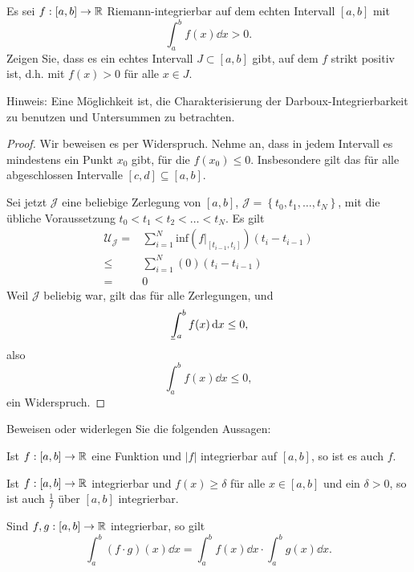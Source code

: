 \begin{Problem}
	Es sei $f:[a,b]\to \mathbb{R}$ Riemann-integrierbar auf dem echten Intervall $[a,b]$ mit
	\[
		\int_a^b f(x)\dd{x}>0
	.\] 
	Zeigen Sie, dass es ein echtes Intervall $J\subset [a,b]$ gibt, auf dem $f$ strikt positiv ist, d.h. mit $f(x)>0$ f\"{u}r alle $x\in J$.

	{\footnotesize Hinweis: Eine Möglichkeit ist, die Charakterisierung der Darboux-Integrierbarkeit zu benutzen und Untersummen zu betrachten.}
\end{Problem}
\begin{proof}
	Wir beweisen es per Widerspruch. Nehme an, dass in jedem Intervall es mindestens ein Punkt $x_0$ gibt, f\"{u}r die $f(x_0)\le 0$. Insbesondere gilt das f\"{u}r alle abgeschlossen Intervalle $[c,d]\subseteq [a,b]$.

	Sei jetzt $\mathcal{J}$ eine beliebige Zerlegung von $[a,b]$, $\mathcal{J}=\left\{ t_0,t_1,\dots,t_N \right\} $, mit die übliche Voraussetzung $t_0< t_1 < t_2<\dots< t_N$. Es gilt
	\begin{align*}
		\mathcal{U}_{\mathcal{J}}=&\sum_{i=1}^{N} \text{inf}\left( f|_{[t_{i-1},t_i]} \right) (t_i-t_{i-1})\\
		\le& \sum_{i=1}^{N} (0)(t_i-t_{i-1})\\
		=& 0
	\end{align*}
	Weil $\mathcal{J}$ beliebig war, gilt das f\"{u}r alle Zerlegungen, und
	\[
		\mkern3mu\underline{\vphantom{\intop}\mkern7mu}\mkern-10mu\int_a^b f(x)\dd{x}\le 0
	,\]
	also
	\[
		\int_a^b f(x)\dd{x}\le 0
	,\] 
	ein Widerspruch.
\end{proof}
\begin{Problem}
	Beweisen oder widerlegen Sie die folgenden Aussagen:
	\begin{parts}
	\item Ist $f:[a,b]\to \mathbb{R}$ eine Funktion und $|f|$ integrierbar auf $[a,b]$, so ist es auch $f$.
	\item Ist $f:[a,b]\to \mathbb{R}$ integrierbar und $f(x)\ge \delta$ f\"{u}r alle $x\in [a,b]$ und ein $\delta>0$, so ist auch $\frac{1}{f}$ \"{u}ber $[a,b]$ integrierbar.
	\item Sind $f,g:[a,b]\to \mathbb{R}$ integrierbar, so gilt
		\[
			\int_a^b(f\cdot g)(x)\dd{x}=\int_a^b f(x)\dd{x}\cdot \int_a^b g(x)\dd{x}
		.\] 
	\end{parts}
\end{Problem}
